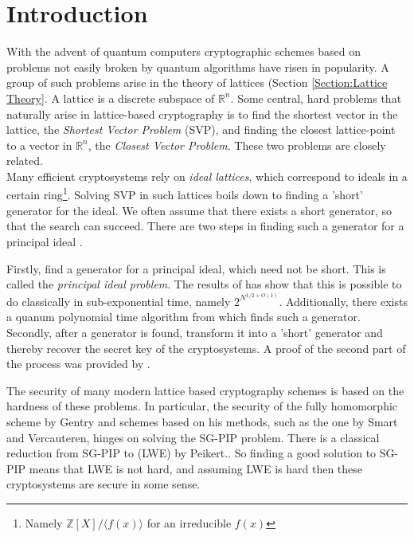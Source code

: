 \section{Introduction}
    \label{Section:Introduction}
    With the advent of quantum computers cryptographic schemes based on problems not easily broken by quantum algorithms have risen in popularity. A group of such problems arise in the theory of lattices (Section \ref{Section:Lattice Theory}. A lattice is a discrete subspace of \(\mathbb{R}^n\). Some central, hard problems that naturally arise in lattice-based cryptography is to find the shortest vector in the lattice, the \emph{Shortest Vector Problem} (SVP), and finding the closest lattice-point to a vector in \(\mathbb{R}^n\), the \emph{Closest Vector Problem}. These two problems are closely related.\\
    
    
    Many efficient cryptosystems rely on \emph{ideal lattices}, which correspond to ideals in a certain ring\footnote{Namely \(\mathbb{Z}[X]/\langle f(x)\rangle\) for an irreducible \(f(x)\)}. Solving SVP in such lattices boils down to finding a 'short' generator for the ideal. We often assume that there exists a short generator, so that the search can succeed. There are two steps in finding such a generator for a principal ideal \cite{Recover Short Gen}.
    
    Firstly, find a generator for a principal ideal, which need not be short. This is called the \emph{principal ideal problem}. The results of \cite{Find Generator Classic} has show that this is possible to do classically in sub-exponential time, namely \(2^{N^{1/2 + O(1)}}\). Additionally, there exists a quanum polynomial time algorithm from \cite{Find Generator Quantum} which finds such a generator. Secondly, after a generator is found, transform it into a 'short' generator and thereby recover the secret key of the cryptosystems. A proof of the second part of the process was provided by \cite{Recover Short Gen}.
    
    The security of many modern lattice based cryptography schemes is based on the hardness of these problems. In particular, the security of the fully homomorphic scheme by Gentry \cite{Gentry} and schemes based on his methods, such as the one by Smart and Vercauteren, hinges on solving the SG-PIP problem. There is a classical reduction from SG-PIP to (LWE) by Peikert.\cite{Reduction PG-PIP LWE}. So finding a good solution to SG-PIP means that LWE is not hard, and assuming LWE is hard then these cryptosystems are secure in some sense.\par
    
